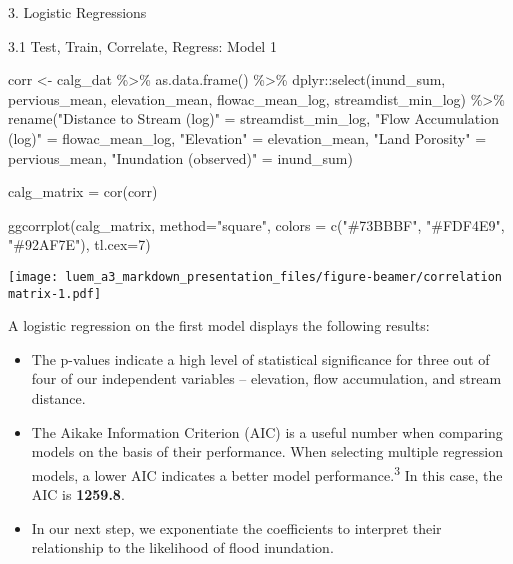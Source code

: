 \documentclass[
  ignorenonframetext,
]{beamer}
\newenvironment{Shaded}{\begin{snugshade}}{\end{snugshade}}
\newcommand{\AttributeTok}[1]{\textcolor[rgb]{0.77,0.63,0.00}{#1}}
\newcommand{\DecValTok}[1]{\textcolor[rgb]{0.00,0.00,0.81}{#1}}
\newcommand{\FunctionTok}[1]{\textcolor[rgb]{0.00,0.00,0.00}{#1}}
\newcommand{\NormalTok}[1]{#1}
\newcommand{\OtherTok}[1]{\textcolor[rgb]{0.56,0.35,0.01}{#1}}
\newcommand{\SpecialCharTok}[1]{\textcolor[rgb]{0.00,0.00,0.00}{#1}}
\newcommand{\StringTok}[1]{\textcolor[rgb]{0.31,0.60,0.02}{#1}}
\begin{document}
\begin{frame}[fragile]{3. Logistic Regressions}
\begin{block}{3.1 Test, Train, Correlate, Regress: Model 1}
\begin{Shaded}
\begin{Highlighting}[]
\NormalTok{corr }\OtherTok{\textless{}{-}}\NormalTok{ calg\_dat }\SpecialCharTok{\%\textgreater{}\%}
  \FunctionTok{as.data.frame}\NormalTok{() }\SpecialCharTok{\%\textgreater{}\%}
\NormalTok{  dplyr}\SpecialCharTok{::}\FunctionTok{select}\NormalTok{(inund\_sum, pervious\_mean, elevation\_mean, flowac\_mean\_log, streamdist\_min\_log) }\SpecialCharTok{\%\textgreater{}\%} 
  \FunctionTok{rename}\NormalTok{(}\StringTok{"Distance to Stream (log)"} \OtherTok{=}\NormalTok{ streamdist\_min\_log,}
         \StringTok{"Flow Accumulation (log)"} \OtherTok{=}\NormalTok{ flowac\_mean\_log,}
         \StringTok{"Elevation"} \OtherTok{=}\NormalTok{ elevation\_mean,}
         \StringTok{"Land Porosity"} \OtherTok{=}\NormalTok{ pervious\_mean,}
         \StringTok{"Inundation (observed)"} \OtherTok{=}\NormalTok{ inund\_sum)}


\NormalTok{calg\_matrix }\OtherTok{=} \FunctionTok{cor}\NormalTok{(corr)}

\FunctionTok{ggcorrplot}\NormalTok{(calg\_matrix, }\AttributeTok{method=}\StringTok{"square"}\NormalTok{, }\AttributeTok{colors =} \FunctionTok{c}\NormalTok{(}\StringTok{"\#73BBBF"}\NormalTok{, }\StringTok{"\#FDF4E9"}\NormalTok{, }\StringTok{"\#92AF7E"}\NormalTok{),}
           \AttributeTok{tl.cex=}\DecValTok{7}\NormalTok{)}
\end{Highlighting}
\end{Shaded}

\texttt{[image: luem\_a3\_markdown\_presentation\_files/figure-beamer/correlation matrix-1.pdf]}

A logistic regression on the first model displays the following results:

\begin{itemize}
\item
  The p-values indicate a high level of statistical significance for
  three out of four of our independent variables -- elevation, flow
  accumulation, and stream distance.
\item
  The Aikake Information Criterion (AIC) is a useful number when
  comparing models on the basis of their performance. When selecting
  multiple regression models, a lower AIC indicates a better model
  performance.\textsuperscript{3} In this case, the AIC is
  \textbf{1259.8}.
\item
  In our next step, we exponentiate the coefficients to interpret their
  relationship to the likelihood of flood inundation.
\end{itemize}


\end{block}
\end{frame}
\end{document}
